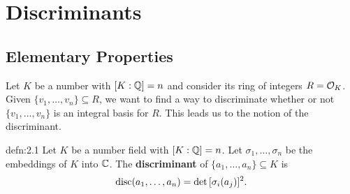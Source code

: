\section{Discriminants}\label{sec:2}

\subsection{Elementary Properties}\label{subsec:2.1}
Let $K$ be a number with $[K : \mathbb{Q}] = n$ and consider its ring of integers 
$R = {\cal O}_K$. Given $\{v_1, \dots, v_n\} \subseteq R$, we want to find a 
way to discriminate whether or not $\{v_1, \dots, v_n\}$ is an integral 
basis for $R$. This leads us to the notion of the discriminant. 

\begin{defn}{defn:2.1}
    Let $K$ be a number field with $[K : \mathbb{Q}] = n$. Let $\sigma_1, 
    \dots, \sigma_n$ be the embeddings of $K$ into $\mathbb{C}$. The 
    {\bf discriminant} of $\{a_1, \dots, a_n\} \subseteq K$ is 
    \[ \operatorname{disc}(a_1, \dots, a_n) = \det\,[\sigma_i(a_j)]^2. \] 
\end{defn}\vspace{-0.15cm}

